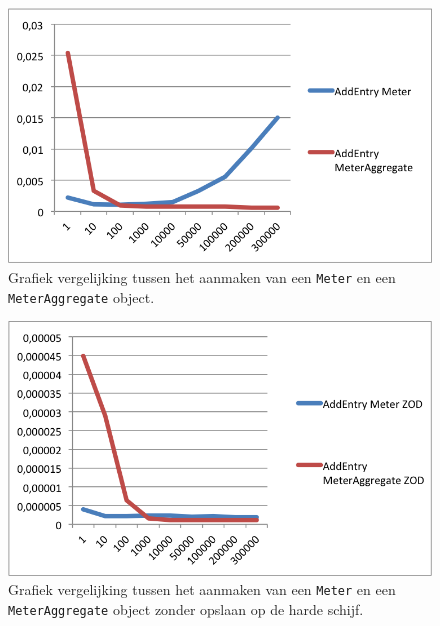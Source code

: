 \begin{figure}[!h]
  \centering
  \includegraphics[scale=1.0]{Afbeeldingen/Evaluatie/MeterVSAggregate}
  \caption{Grafiek vergelijking tussen het aanmaken van een \texttt{Meter} en een \texttt{MeterAggregate} object.}
  \label{fig:MeterVSAggregate}
\end{figure}

\begin{figure}[!h]
  \centering
  \includegraphics[scale=1.0]{Afbeeldingen/Evaluatie/MeterVSAggregateZOD}
  \caption{Grafiek vergelijking tussen het aanmaken van een \texttt{Meter} en een \texttt{MeterAggregate} object zonder opslaan op de harde schijf.}
  \label{fig:MeterVSAggregateZOD}
\end{figure}

